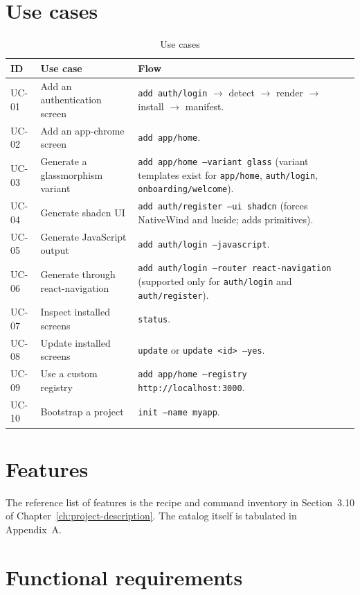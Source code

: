\section{Use cases}

\begin{longtable}{p{2.2cm}p{5.2cm}p{7.2cm}}
\caption{Use cases}\\
\toprule
\textbf{ID} & \textbf{Use case} & \textbf{Flow} \\
\midrule

UC-01 & Add an authentication screen & \texttt{add auth/login} $\rightarrow$ detect $\rightarrow$ render $\rightarrow$ install $\rightarrow$ manifest. \\
UC-02 & Add an app-chrome screen & \texttt{add app/home}. \\
UC-03 & Generate a glassmorphism variant & \texttt{add app/home --variant glass} (variant templates exist for \texttt{app/home}, \texttt{auth/login}, \texttt{onboarding/welcome}). \\
UC-04 & Generate shadcn UI & \texttt{add auth/register --ui shadcn} (forces NativeWind and lucide; adds primitives). \\
UC-05 & Generate JavaScript output & \texttt{add auth/login --javascript}. \\
UC-06 & Generate through react-navigation & \texttt{add auth/login --router react-navigation} (supported only for \texttt{auth/login} and \texttt{auth/register}). \\
UC-07 & Inspect installed screens & \texttt{status}. \\
UC-08 & Update installed screens & \texttt{update} or \texttt{update <id> --yes}. \\
UC-09 & Use a custom registry & \texttt{add app/home --registry http://localhost:3000}. \\
UC-10 & Bootstrap a project & \texttt{init --name myapp}. \\
\bottomrule
\end{longtable}

\section{Features}

The reference list of features is the recipe and command inventory in
Section~3.10 of Chapter~\ref{ch:project-description}. The catalog itself is
tabulated in Appendix~A.

\section{Functional requirements}

